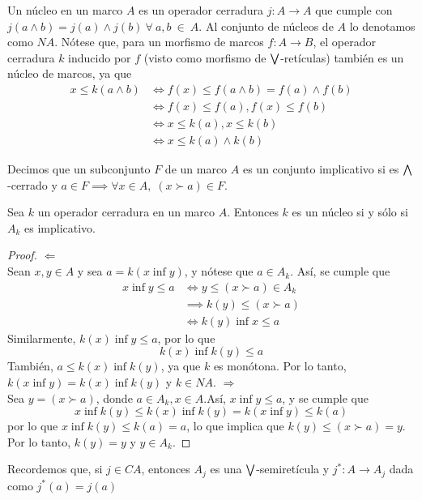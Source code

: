 \begin{defn}
\label{def:nucleo}
Un núcleo en un marco $A$ es un operador cerradura $j:A \to A$ que cumple con $j(a\wedge b)=j(a)\wedge j(b) \ \forall \ a,b \ \in \ A$.
Al conjunto de núcleos de $A$ lo denotamos como $NA$.
Nótese que, para un morfismo de marcos $f: A\to B$,
el operador cerradura $k$
inducido por $f$ (visto como morfismo de $\bigvee$-retículas)
también es un núcleo de marcos, ya que
\begin{align*}
x\leq k(a\wedge b)&\iff f(x)\leq f(a\wedge b)=f(a)\wedge f(b)\\
&\iff f(x)\leq f(a) , f(x)\leq f(b) \\
&\iff x\leq k(a), x\leq k(b)\\
& \iff x\leq k(a)\wedge k(b)
\end{align*}
\end{defn}
\begin{defn}
Decimos que un subconjunto $F$ de un marco $A$ es un conjunto
implicativo si es $\bigwedge$-cerrado y
$a\in F \implies  \forall x \in A,\; (x\succ a)\in F$.
\end{defn}
\begin{lemma}
Sea $k$ un operador cerradura en un marco $A$.
Entonces $k$ es un núcleo si  y sólo si $A_k$ es implicativo.
\end{lemma}
\begin{proof}
$\Leftarrow$\\
Sean $x,y \in A$ y sea $a=k(x\inf y)$, y nótese que $a\in A_k$. Así, se cumple que 
\begin{align*}
    x\inf y\leq a
    & \iff y\leq (x\succ a)\in A_k\\
    &\implies k(y)\leq (x\succ a)\\
    &\iff k(y)\inf x\leq a
\end{align*}
Similarmente, $k(x)\inf y\leq a$, por lo que 
$$ k(x)\inf k(y)\leq a$$
También, $a\leq k(x)\inf k(y)$, ya que $k$ es monótona.
Por lo tanto, $k(x\inf y)=k(x)\inf k(y)$ y $k\in NA$.
\vspace{5mm}
$\Rightarrow$\\
Sea $y=(x\succ a)$, donde $a\in A_k, x\in A$.Así, $x\inf y\leq a$, y se cumple que 
$$x\inf k(y)\leq k(x)\inf k(y) =k(x\inf y)\leq k(a)$$
por lo que $x\inf k(y)\leq k(a)=a$, lo que implica que $k(y)\leq (x\succ a)=y$. Por lo tanto, $k(y)=y$ y $y\in A_k$.
\end{proof}
Recordemos que, si $j\in CA$, entonces $A_j$ es una $\bigvee$-semiretícula
y $j^*:A\to A_j$ dada como $j^*(a)=j(a)$

